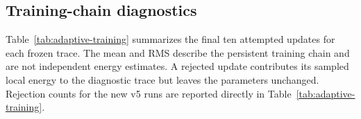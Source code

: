 \begin{table}[H]
\centering
\caption{Authoritative local calculations used in v5. Both fillings' outer
runs use independent
parameters and shared mixture sampling for updates 1--20.}
\label{tab:adaptive-runs}
\end{table}

\subsection{Training-chain diagnostics}

Table~\ref{tab:adaptive-training} summarizes the final ten attempted updates
for each frozen trace.
The mean and RMS describe the persistent training chain and are not independent
energy estimates.  A rejected update contributes its sampled local energy to
the diagnostic trace but leaves the parameters unchanged. Rejection counts
for the new v5 runs are reported directly in Table~\ref{tab:adaptive-training}.

